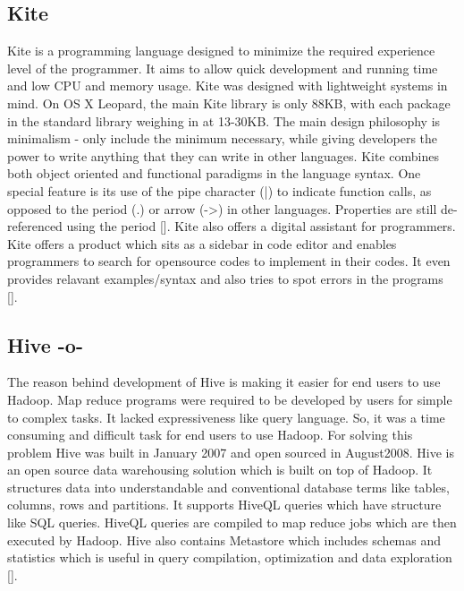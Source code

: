 \subsection{Kite}

Kite is a programming language designed to minimize the required
experience level of the programmer.  It aims to allow quick
development and running time and low CPU and memory usage. Kite was
designed with lightweight systems in mind.  On OS X Leopard, the main
Kite library is only 88KB, with each package in the standard library
weighing in at 13-30KB. The main design philosophy is minimalism -
only include the minimum necessary, while giving developers the power
to write anything that they can write in other languages. Kite
combines both object oriented and functional paradigms in the language
syntax.  One special feature is its use of the pipe character (|) to
indicate function calls, as opposed to the period (.) or arrow (->) in
other languages.  Properties are still de-referenced using the
period [\cite{kite-devtopics}]. Kite also offers a digital assistant for
programmers. Kite offers a product which sits as a sidebar in code
editor and enables programmers to search for opensource codes to
implement in their codes. It even provides relavant examples/syntax
and also tries to spot errors in the programs [\cite{kite-wired}].
     
\subsection{Hive -o-}
     
The reason behind development of Hive is making it easier for end
users to use Hadoop. Map reduce programs were required to be developed
by users for simple to complex tasks. It lacked expressiveness like
query language. So, it was a time consuming and difficult task for end
users to use Hadoop. For solving this problem Hive was built in
January 2007 and open sourced in August2008.  Hive is an open source
data warehousing solution which is built on top of Hadoop. It
structures data into understandable and conventional database terms
like tables, columns, rows and partitions. It supports HiveQL queries
which have structure like SQL queries. HiveQL queries are compiled to
map reduce jobs which are then executed by Hadoop.  Hive also contains
Metastore which includes schemas and statistics which is useful in
query compilation, optimization and data exploration [\cite{www-hive}].




